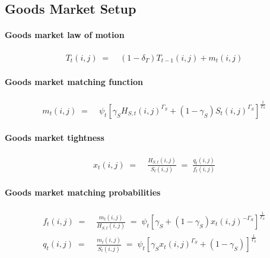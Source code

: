 \documentclass[12pt,3p,authoryear,review]{elsarticle}
\begin{document}
\subsection{Goods Market Setup}%
\begin{small}%
	\paragraph{Goods market law of motion}%
	\begin{align}%
	 	T_t(i,j) \; = & \; \left(1-\delta_T\right) T_{t-1}(i,j) + m_t(i,j)\label{eq:appendix_matching}%
	\end{align}%
	\paragraph{Goods market matching function}%
	\begin{align}%
		m_t(i,j) \; = & \; \psi_{t} \left[ \gamma_S H_{S,t}(i,j)^{\Gamma_S} + (1-\gamma_S) S_t(i,j)^{\Gamma_S} \right]^{\frac{1}{\Gamma_S}}%
	\end{align}%
	\paragraph{Goods market tightness}%
	\begin{align}%
		x_t(i,j) \; = & \; \frac{H_{S,t}(i,j)}{S_t(i,j)} \; = \; \frac{q_t(i,j)}{f_t(i,j)}\label{eq:appendix_tightness}%
	\end{align}%
	\paragraph{Goods market matching probabilities}%
	\begin{align}%
	 	f_t(i,j) \; = & \; \frac{m_t(i,j)}{H_{S,t}(i,j)} \; = \; \psi_{t} \left[ \gamma_S + (1-\gamma_S) x_t(i,j)^{-\Gamma_S} \right]^{\frac{1}{\Gamma_S}}\\%
	 	q_t(i,j) \; = & \; \frac{m_t(i,j)}{S_t(i,j)} \; = \; \psi_{t} \left[ \gamma_S x_t(i,j)^{\Gamma_S} + (1-\gamma_S) \right]^{\frac{1}{\Gamma_S}}%
	\end{align}%
\end{small}%
\pagebreak%
\end{document}

